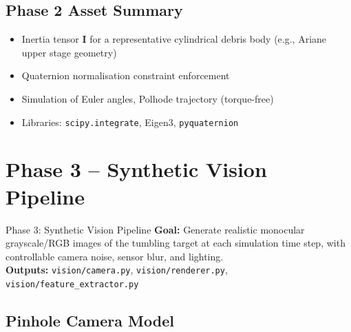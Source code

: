 \documentclass[12pt, a4paper]{article}
\begin{document}
\subsection{Phase 2 Asset Summary}
\begin{assetbox}[title=Phase 2 Assets]
\begin{itemize}[leftmargin=1.5em, itemsep=2pt]
    \item Inertia tensor $\mathbf{I}$ for a representative cylindrical debris
          body (e.g., Ariane upper stage geometry)
    \item Quaternion normalisation constraint enforcement
    \item Simulation of Euler angles, Polhode trajectory (torque-free)
    \item Libraries: \texttt{scipy.integrate}, Eigen3, \texttt{pyquaternion}
\end{itemize}
\end{assetbox}

\section{Phase 3 -- Synthetic Vision Pipeline}

\begin{phasebox}{Phase 3: Synthetic Vision Pipeline}
\textbf{Goal:} Generate realistic monocular grayscale/RGB images of the
tumbling target at each simulation time step, with controllable camera
noise, sensor blur, and lighting.\\[0.5em]
\textbf{Outputs:} \texttt{vision/camera.py}, \texttt{vision/renderer.py},
\texttt{vision/feature\_extractor.py}
\end{phasebox}

\subsection{Pinhole Camera Model}
\end{document}
